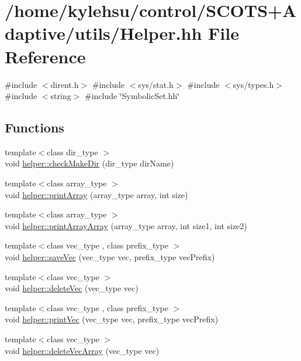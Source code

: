 \hypertarget{Helper_8hh}{}\section{/home/kylehsu/control/\+S\+C\+O\+T\+S+\+Adaptive/utils/\+Helper.hh File Reference}
\label{Helper_8hh}
{\ttfamily \#include $<$dirent.\+h$>$}\newline
{\ttfamily \#include $<$sys/stat.\+h$>$}\newline
{\ttfamily \#include $<$sys/types.\+h$>$}\newline
{\ttfamily \#include $<$string$>$}\newline
{\ttfamily \#include \char`\"{}Symbolic\+Set.\+hh\char`\"{}}\newline
\subsection*{Functions}
\begin{DoxyCompactItemize}
\item 
{\footnotesize template$<$class dir\+\_\+type $>$ }\\void \hyperlink{Helper_8hh_a54c684ce784017d4c61e9fc7a179be67}{helper\+::check\+Make\+Dir} (dir\+\_\+type dir\+Name)
\item 
{\footnotesize template$<$class array\+\_\+type $>$ }\\void \hyperlink{Helper_8hh_ad3a9b9a5d8b46962dae72719f691201c}{helper\+::print\+Array} (array\+\_\+type array, int size)
\item 
{\footnotesize template$<$class array\+\_\+type $>$ }\\void \hyperlink{Helper_8hh_a4c64e0acf408f16a166c998a80fc548d}{helper\+::print\+Array\+Array} (array\+\_\+type array, int size1, int size2)
\item 
{\footnotesize template$<$class vec\+\_\+type , class prefix\+\_\+type $>$ }\\void \hyperlink{Helper_8hh_afea778bfb31cba93e003c382413c36b2}{helper\+::save\+Vec} (vec\+\_\+type vec, prefix\+\_\+type vec\+Prefix)
\item 
{\footnotesize template$<$class vec\+\_\+type $>$ }\\void \hyperlink{Helper_8hh_a4cfbf4be07fc1d320df3c06ab77ff469}{helper\+::delete\+Vec} (vec\+\_\+type vec)
\item 
{\footnotesize template$<$class vec\+\_\+type , class prefix\+\_\+type $>$ }\\void \hyperlink{Helper_8hh_a33cb7ae024bddfc7874b8aaa80d46f4b}{helper\+::print\+Vec} (vec\+\_\+type vec, prefix\+\_\+type vec\+Prefix)
\item 
{\footnotesize template$<$class vec\+\_\+type $>$ }\\void \hyperlink{Helper_8hh_a204cd701ae182be7b10e2017e259285b}{helper\+::delete\+Vec\+Array} (vec\+\_\+type vec)
\end{DoxyCompactItemize}


